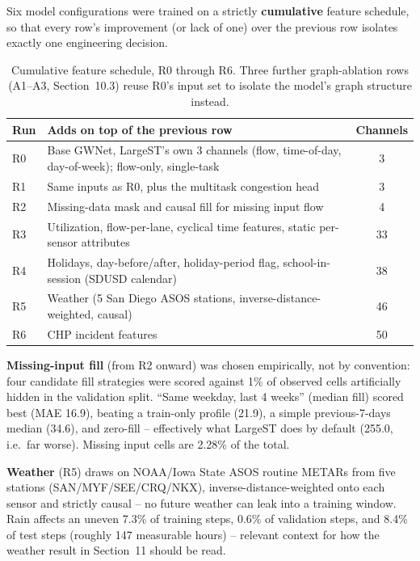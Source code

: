 \documentclass[11pt]{article}
\begin{document}
Six model configurations were trained on a strictly \textbf{cumulative} feature schedule, so that
every row's improvement (or lack of one) over the previous row isolates exactly one engineering
decision.

\begin{table}[htbp]
\centering
\small
\begin{tabular}{@{}lp{7.6cm}c@{}}
\toprule
\textbf{Run} & \textbf{Adds on top of the previous row} & \textbf{Channels} \\
\midrule
R0 & Base GWNet, LargeST's own 3 channels (flow, time-of-day, day-of-week); flow-only, single-task & 3 \\
R1 & Same inputs as R0, plus the multitask congestion head & 3 \\
R2 & Missing-data mask and causal fill for missing input flow & 4 \\
R3 & Utilization, flow-per-lane, cyclical time features, static per-sensor attributes & 33 \\
R4 & Holidays, day-before/after, holiday-period flag, school-in-session (SDUSD calendar) & 38 \\
R5 & Weather (5 San Diego ASOS stations, inverse-distance-weighted, causal) & 46 \\
R6 & CHP incident features & 50 \\
\bottomrule
\end{tabular}
\caption{Cumulative feature schedule, R0 through R6. Three further graph-ablation rows (A1--A3,
Section~10.3) reuse R0's input set to isolate the model's graph structure instead.}
\end{table}

\textbf{Missing-input fill} (from R2 onward) was chosen empirically, not by convention: four
candidate fill strategies were scored against 1\% of observed cells artificially hidden in the
validation split. ``Same weekday, last 4 weeks'' (median fill) scored best (MAE 16.9), beating a
train-only profile (21.9), a simple previous-7-days median (34.6), and zero-fill -- effectively
what LargeST does by default (255.0, i.e.\ far worse). Missing input cells are 2.28\% of the total.

\textbf{Weather} (R5) draws on NOAA/Iowa State ASOS routine METARs from five stations
(SAN/MYF/SEE/CRQ/NKX), inverse-distance-weighted onto each sensor and strictly causal --
no future weather can leak into a training window. Rain affects an uneven 7.3\% of training
steps, 0.6\% of validation steps, and 8.4\% of test steps (roughly 147 measurable hours) --
relevant context for how the weather result in Section~11 should be read.
\end{document}

